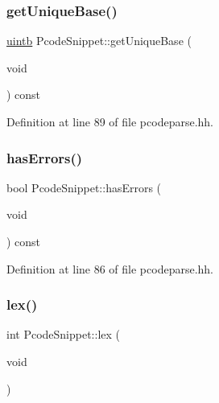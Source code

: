 \subsubsection{\texorpdfstring{getUniqueBase()}{getUniqueBase()}}
{\footnotesize\ttfamily \mbox{\hyperlink{types_8h_a2db313c5d32a12b01d26ac9b3bca178f}{uintb}} Pcode\+Snippet\+::get\+Unique\+Base (\begin{DoxyParamCaption}\item[{void}]{ }\end{DoxyParamCaption}) const\hspace{0.3cm}{\ttfamily [inline]}}



Definition at line 89 of file pcodeparse.\+hh.

\mbox{\label{class_pcode_snippet_a349148e16b340f5b0798ce3414b35e3c}} 
\subsubsection{\texorpdfstring{hasErrors()}{hasErrors()}}
{\footnotesize\ttfamily bool Pcode\+Snippet\+::has\+Errors (\begin{DoxyParamCaption}\item[{void}]{ }\end{DoxyParamCaption}) const\hspace{0.3cm}{\ttfamily [inline]}}



Definition at line 86 of file pcodeparse.\+hh.

\mbox{\label{class_pcode_snippet_a0a411eb7a56f99bda08f4df48f78d510}} 
\subsubsection{\texorpdfstring{lex()}{lex()}}
{\footnotesize\ttfamily int Pcode\+Snippet\+::lex (\begin{DoxyParamCaption}\item[{void}]{ }\end{DoxyParamCaption})}

\mbox{\label{class_pcode_snippet_afa88b6062d6e6fd89a2597be387d906d}} 
